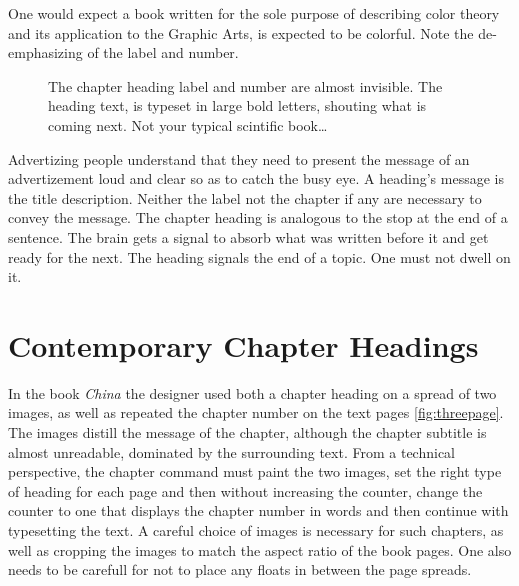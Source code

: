 \begin{figure}[htbp]
\parindent=0pt
\centering
{}
\bigskip

\end{figure}

One would expect a book written for the sole purpose of describing color theory and its application to the Graphic Arts, is expected to be colorful. Note the de-emphasizing of the label and number. 

\begin{figure}[htbp]
\parindent=0pt
\centering
{}
The chapter heading label and number are almost invisible. The heading text, is typeset in large bold letters, shouting what is coming next. Not your typical scintific book\ldots
\bigskip

\end{figure}

Advertizing people understand that they need to present the message of an advertizement loud and clear so as to catch the busy eye. A heading's message is the title description. Neither the label not the chapter if any are necessary to convey the message. The chapter heading is analogous to the stop at the end of a sentence. The brain gets a signal to absorb what was written before it and get ready for the next. The heading signals the end of a topic. One must not dwell on it.


\section{Contemporary Chapter Headings}

In the book \textit{China} the designer used both a chapter heading on a spread of two images, as well as repeated the chapter number on the text pages \ref{fig:threepage}. The images distill the message of the chapter, although the chapter subtitle is almost unreadable, dominated by the surrounding text. From a technical perspective, the chapter command must paint the two images, set the right type of heading for each page and then without increasing the counter, change the counter to one that displays the chapter number in words and then continue with typesetting the text. A careful choice of images is necessary for such chapters, as well as cropping the images to match the aspect ratio of the book pages. One also needs to be carefull for \latexe not to place any floats in between the page spreads. 

